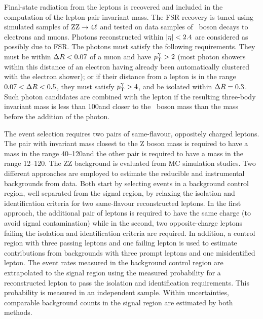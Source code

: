 \documentclass[11pt,twoside,a4paper,cmspaper,final]{cms-tdr}
\begin{document}
Final-state radiation from the leptons is recovered and included
in the computation of the lepton-pair invariant mass.
The FSR recovery is
tuned using simulated samples of $\mathrm{Z}\mathrm{Z}\to 4\ell$ and tested on data samples
of \cPZ\ boson decays to electrons and muons.
Photons reconstructed within $\lvert \eta \rvert < 2.4$ are
considered as possibly due to FSR.
The photons must satisfy the following requirements. They must be within $\Delta R < 0.07$ of a muon and have
 $p_{\mathrm{T}}^\gamma > 2$\GeV
(most photon showers within this distance of an electron having already been
automatically clustered with the electron shower);
or if their distance from a lepton is in the range $0.07 < \Delta R < 0.5$,
they must satisfy $p_{\mathrm{T}}^\gamma > 4$\GeV, and be isolated within $\Delta R = 0.3$.
Such photon candidates are combined with the lepton if the resulting
three-body invariant mass is less than 100\GeV and closer to the \cPZ\ boson mass
than the mass before the addition of the photon.


The event selection requires two pairs of same-flavour, oppositely charged
leptons.
The pair with invariant mass closest to the Z boson mass is required to have a mass in the
range 40--120\GeV and the other pair is required to have
a mass in the range 12--120\GeV.
The ZZ background is evaluated from MC simulation studies.
Two different approaches are employed to estimate the reducible and instrumental backgrounds from data.
Both start by selecting events in a background control region, well
separated from the signal region,
by relaxing the isolation and identification criteria for two
same-flavour reconstructed leptons.
In the first approach, the additional pair of leptons is required to
have the same charge (to avoid signal contamination) while in the
second, two opposite-charge leptons failing the isolation and identification
criteria are required.
In addition, a control region with three passing leptons and one failing lepton is used to estimate contributions
from backgrounds with three prompt leptons and one misidentified lepton.
The event rates measured in the background control region are extrapolated to
the signal region using the measured probability for a
reconstructed lepton to pass the isolation and identification
requirements.
This probability is measured in an independent sample.
Within uncertainties, comparable background counts in the signal
region are estimated by both methods.
\end{document}
